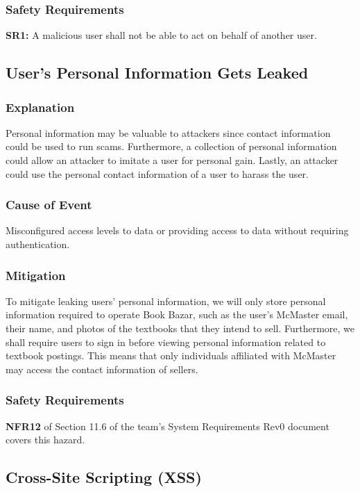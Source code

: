 \documentclass[fullpage]{article}
\begin{document}
\subsubsection*{Safety Requirements}

\textbf{SR1:} A malicious user shall not be able to act on behalf of another user.

\subsection{User's Personal Information Gets Leaked}

\subsubsection*{Explanation}
Personal information may be valuable to attackers since contact information could be used to run scams. Furthermore, a collection of personal information could allow an attacker to imitate a user for personal gain. Lastly, an attacker could use the personal contact information of a user to harass the user.

\subsubsection*{Cause of Event}
Misconfigured access levels to data or providing access to data without requiring authentication.

\subsubsection*{Mitigation}
To mitigate leaking users’ personal information, we will only store personal information required to operate Book Bazar, such as the user’s McMaster email, their name, and photos of the textbooks that they intend to sell. Furthermore, we shall require users to sign in before viewing personal information related to textbook postings. This means that only individuals affiliated with McMaster may access the contact information of sellers.

\subsubsection*{Safety Requirements}
\textbf{NFR12} of Section 11.6 of the team's System Requirements Rev0 document covers this hazard.

\subsection{Cross-Site Scripting (XSS)}
\end{document}
